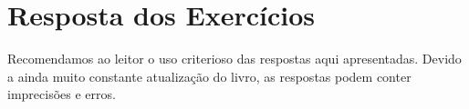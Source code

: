 
\chapter*{Resposta dos Exercícios}
\iflatexml\else{}\fi
{}
\fancyhead[LE,RO]{\thepage}

Recomendamos ao leitor o uso criterioso das respostas aqui apresentadas. Devido a ainda muito constante atualização do livro, as respostas podem conter imprecisões e erros.
\shipoutAnswer
